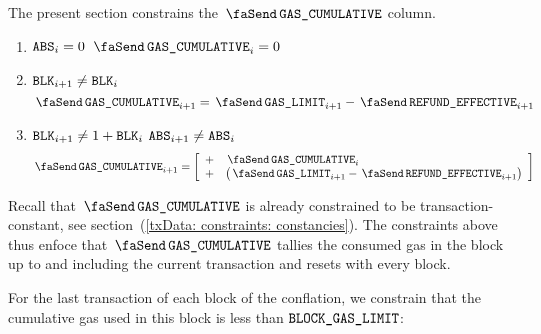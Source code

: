 The present section constrains the $\txCumulativeConsumedGas$ column. 
\begin{enumerate}
	\item \If $\texttt{ABS}_{i} = 0$ \Then $\txCumulativeConsumedGas_{i} = 0$
	\item \If $\texttt{BLK}_{i + 1} \neq \texttt{BLK}_{i}$ \Then
		\[ \txCumulativeConsumedGas_{i + 1} = \txGasLimit_{i + 1} - \txEffectiveRefund_{i + 1} \]
	\item \If $\texttt{BLK}_{i + 1} \neq 1 + \texttt{BLK}_{i}$ \et $\texttt{ABS}_{i + 1} \neq \texttt{ABS}_{i}$ \Then
		\[
			\txCumulativeConsumedGas_{i + 1} 
			=
			\left[ \begin{array}{ll}
				+ & \txCumulativeConsumedGas_{i}                           \\
				+ & \big(\txGasLimit_{i + 1} - \txEffectiveRefund_{i + 1}\big) \\
			\end{array}\right]
		\]
\end{enumerate}
Recall that $\txCumulativeConsumedGas$ is already constrained to be transaction-constant, see section~(\ref{txData: constraints: constancies}).
The constraints above thus enfoce that $\txCumulativeConsumedGas$ tallies the consumed gas in the block up to and including the current transaction and resets with every block.

For the last transaction of each block of the conflation, we constrain that the cumulative gas used in this block is less than $\texttt{BLOCK\_GAS\_LIMIT}$:

